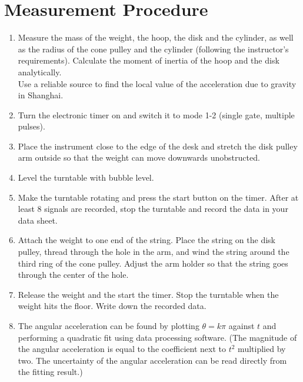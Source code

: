 \section{Measurement Procedure}
\begin{enumerate}
    \item Measure the mass of the weight, the hoop, the disk and the cylinder, as well as the radius of the cone pulley and the cylinder (following the instructor's requirements). Calculate the moment of inertia of the hoop and the disk analytically.\\
    Use a reliable source to find the local value of the acceleration due to gravity in Shanghai.
    \item Turn the electronic timer on and switch it to mode 1-2 (single gate, multiple pulses).
    \item Place the instrument close to the edge of the desk and stretch the disk pulley arm outside so that the weight can move downwards unobstructed.
    \item Level the turntable with bubble level.
    \item Make the turntable rotating and press the start button on the timer. After at least 8 signals are recorded, stop the turntable and record the data in your data sheet.
    \item Attach the weight to one end of the string. Place the string on the disk pulley, thread through the hole in the arm, and wind the string around the third ring of the cone pulley. Adjust the arm holder so that the string goes through the center of the hole.
    \item Release the weight and the start the timer. Stop the turntable when the weight hits the floor. Write down the recorded data.
    \item The angular acceleration can be found by plotting $\theta=k\pi$ against $t$ and performing a quadratic fit using data processing software. (The magnitude of the angular acceleration is equal to the coefficient next to $t^2$ multiplied by two. The uncertainty of the angular acceleration can be read directly from the fitting result.)
\end{enumerate}